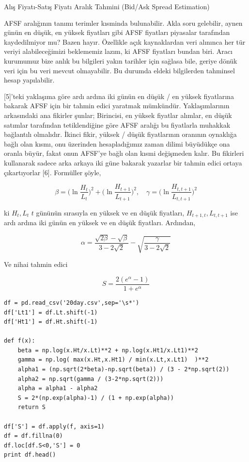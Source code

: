 \documentclass[12pt,fleqn]{article}\usepackage{../../common}
\begin{document}
Alış Fiyatı-Satış Fiyatı Aralık Tahmini (Bid/Ask Spread Estimation)

AFSF aralığının tanımı terimler kısminda bulunabilir. Akla soru gelebilir, aynen
günün en düşük, en yüksek fiyatları gibi AFSF fiyatları piyasalar tarafından
kaydedilmiyor mu?  Bazen hayır. Özellikle açık kaynaklardan veri alınınca her
tür veriyi alabileceğimizi beklememiz lazım, ki AFSF fiyatları bundan
biri. Aracı kurumumuz bize anlık bu bilgileri yakın tarihler için sağlasa bile,
geriye dönük veri için bu veri mevcut olmayabilir. Bu durumda eldeki bilgilerden
tahminsel hesap yapılabilir.

[5]'teki yaklaşıma göre ardı ardına iki günün en düşük / en yüksek fiyatlarına
bakarak AFSF için bir tahmin edici yaratmak mümkündür. Yaklaşımlarının
arkasındaki ana fikirler şunlar; Birincisi, en yüksek fiyatlar alımlar, en düşük
satımlar tarafından tetiklendiğine göre AFSF aralığı bu fiyatlarla muhakkak
bağlantılı olmalıdır. İkinci fikir, yüksek / düşük fiyatlarının oranının
oynaklığa bağlı olan kısmı, onu üzerinden hesapladığımız zaman dilimi büyüdükçe
ona oranla büyür, fakat onun AFSF'ye bağlı olan kısmi değişmeden kalır. Bu
fikirleri kullanarak sadece arka arkaya iki güne bakarak yazarlar bir tahmin
edici ortaya çıkartıyorlar [6]. Formüller şöyle,

$$
\beta =
\bigg(
 \ln \frac{H_t}{L_t} \bigg)^2 +  \bigg( \ln \frac{H_{t+1}}{L_{t+1}}
\bigg)^2, \quad
\gamma = \bigg( \ln \frac{H_{t,t+1}}{L_{t,t+1}} \bigg)^2
$$

ki $H_t,L_t$ $t$ gününün sırasıyla en yüksek ve en düşük fiyatları,
$H_{t+1,t},L_{t,t+1}$ ise ardı ardına iki günün en yüksek ve en düşük
fiyatları. Ardından,

$$ \alpha = \frac{\sqrt{2 \beta} - \sqrt{\beta}}{3 - 2 \sqrt{2}} -
\sqrt{\frac{\gamma}{3 - 2\sqrt{2}}}
$$

Ve nihai tahmin edici

$$ S = \frac{2 (e^{\alpha} - 1 )}{1 + e^{\alpha}} $$

\begin{verbatim}
df = pd.read_csv('20day.csv',sep='\s*')
df['Lt1'] = df.Lt.shift(-1)
df['Ht1'] = df.Ht.shift(-1)

def f(x):
    beta = np.log(x.Ht/x.Lt)**2 + np.log(x.Ht1/x.Lt1)**2
    gamma = np.log( max(x.Ht,x.Ht1) / min(x.Lt,x.Lt1)  )**2
    alpha1 = (np.sqrt(2*beta)-np.sqrt(beta)) / (3 - 2*np.sqrt(2))
    alpha2 = np.sqrt(gamma / (3-2*np.sqrt(2)))
    alpha = alpha1 - alpha2
    S = 2*(np.exp(alpha)-1) / (1 + np.exp(alpha))
    return S

df['S'] = df.apply(f, axis=1)
df = df.fillna(0)
df.loc[df.S<0,'S'] = 0
print df.head()
\end{verbatim}
\end{document}
